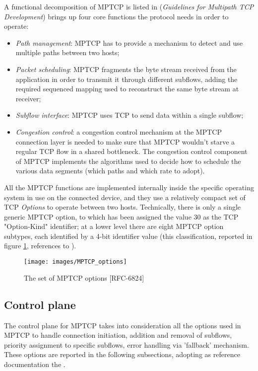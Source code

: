 A functional decomposition of MPTCP is listed in  (\textit{Guidelines for Multipath TCP Development}) brings up four core functions the protocol needs in order to operate:
\begin{itemize}
  \item \textit{Path management}: MPTCP has to provide a mechanism to detect and use multiple paths between two hosts;
  \item \textit{Packet scheduling}: MPTCP fragments the byte stream received from the application in order to transmit it through different subflows, adding the required sequenced mapping used to reconstruct the same byte stream at receiver;
  \item \textit{Subflow interface}: MPTCP uses TCP to send data within a single subflow;
  \item \textit{Congestion control}: a congestion control mechanism at the MPTCP connection layer is needed to make sure that MPTCP wouldn't starve a regular TCP flow in a shared bottleneck. The congestion control component of MPTCP implements the algorithms used to decide how to schedule the various data segments (which paths and which rate to adopt).
  \end{itemize}

All the MPTCP functions are implemented internally inside the specific operating system in use on the connected device, and they use a relatively compact set of TCP \textit{Options} to operate between two hosts. Technically, there is only a single generic MPTCP option, to which has been assigned the value 30 as the TCP "Option-Kind" identifier; at a lower level there are eight MPTCP option subtypes, each identified by a 4-bit identifier value (this classification, reported in figure \ref{fig:MPTCP_options}, references to ). 

\begin{figure}[!htb]
\centering
\texttt{[image: images/MPTCP\_options]}
\caption{The set of MPTCP options [RFC-6824]}
\label{fig:MPTCP_options}
\end{figure}

\subsection{Control plane}
The control plane for MPTCP takes into consideration all the options used in MPTCP to handle connection initiation, addition and removal of subflows, priority assignment to specific subflows, error handling via 'fallback' mechanism. These options are reported in the following subsections, adopting as reference documentation the .

